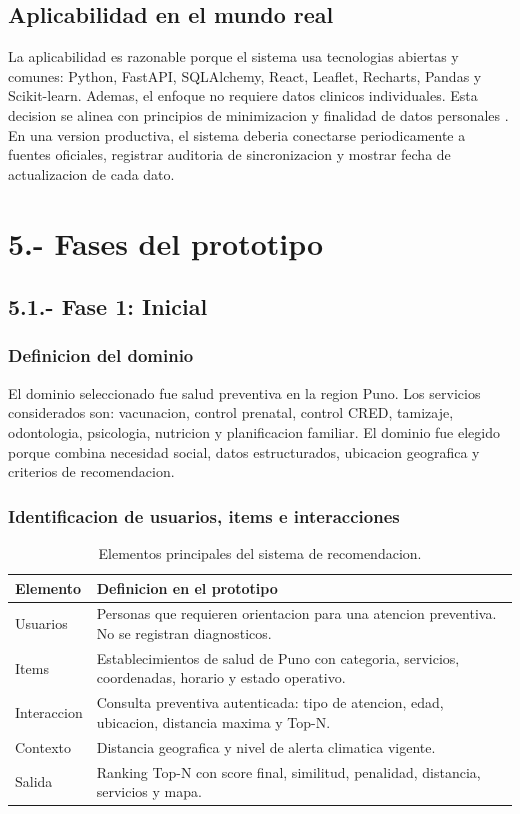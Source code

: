 \documentclass[12pt,a4paper]{article}
\begin{document}
\subsection{Aplicabilidad en el mundo real}
La aplicabilidad es razonable porque el sistema usa tecnologias abiertas y comunes: Python, FastAPI, SQLAlchemy, React, Leaflet, Recharts, Pandas y Scikit-learn. Ademas, el enfoque no requiere datos clinicos individuales. Esta decision se alinea con principios de minimizacion y finalidad de datos personales \citep{ley29733,ds0032013}. En una version productiva, el sistema deberia conectarse periodicamente a fuentes oficiales, registrar auditoria de sincronizacion y mostrar fecha de actualizacion de cada dato.

\section{5.- Fases del prototipo}
\subsection{5.1.- Fase 1: Inicial}
\subsubsection{Definicion del dominio}
El dominio seleccionado fue salud preventiva en la region Puno. Los servicios considerados son: vacunacion, control prenatal, control CRED, tamizaje, odontologia, psicologia, nutricion y planificacion familiar. El dominio fue elegido porque combina necesidad social, datos estructurados, ubicacion geografica y criterios de recomendacion.

\subsubsection{Identificacion de usuarios, items e interacciones}
\begin{table}[H]
\centering
\caption{Elementos principales del sistema de recomendacion.}
\label{tab:dominio}
\begin{tabular}{p{3.2cm}p{9.6cm}}
\toprule
Elemento & Definicion en el prototipo \\
\midrule
Usuarios & Personas que requieren orientacion para una atencion preventiva. No se registran diagnosticos. \\
Items & Establecimientos de salud de Puno con categoria, servicios, coordenadas, horario y estado operativo. \\
Interaccion & Consulta preventiva autenticada: tipo de atencion, edad, ubicacion, distancia maxima y Top-N. \\
Contexto & Distancia geografica y nivel de alerta climatica vigente. \\
Salida & Ranking Top-N con score final, similitud, penalidad, distancia, servicios y mapa. \\
\bottomrule
\end{tabular}
\end{table}
\end{document}

